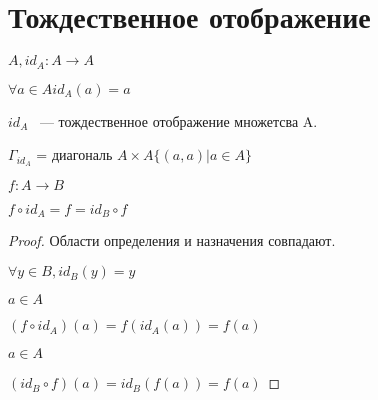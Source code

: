 ﻿\section{Тождественное отображение}

\begin{Def}
$A, id_{A}: A \to A$

$\forall a \in A id_A(a) = a$

$id_A$ ~--- тождественное  отображение множетсва A.

$\Gamma_{id_A}$ = диагональ $A \times A \{(a, a)| a \in A\}$ 
\end{Def}

\begin{theorem}{}
$f: A \to B$

$f \circ id_A = f =  id_B \circ f$
\end{theorem}

\begin{proof}

Области определения и назначения совпадают. 

$\forall y \in B, id_{B}(y) = y$

$a \in A$

$(f \circ id_A)(a) = f(id_A(a)) = f(a)$

$a \in A$

$(id_B \circ f)(a) = id_B(f(a)) = f(a)$

\end{proof}